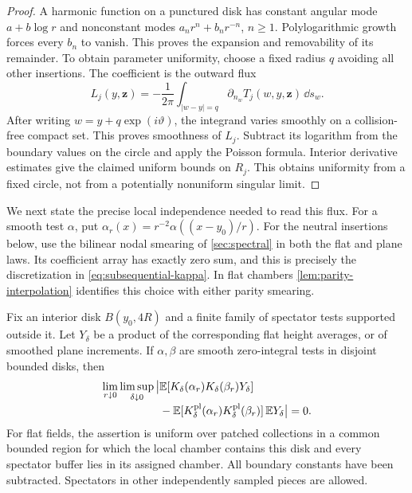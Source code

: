 \begin{proof}
A harmonic function on a punctured disk has constant angular mode
$a+b\log r$ and nonconstant modes $a_n r^n+b_n r^{-n}$, $n\geq1$.
Polylogarithmic growth forces every $b_n$ to vanish. This proves the
expansion and removability of its remainder. To obtain parameter
uniformity, choose a fixed radius $q$ avoiding all other insertions.
The coefficient is the outward flux
\begin{equation}
 L_j(y,\mathbf z)
 =-\frac1{2\pi}\int_{|w-y|=q}
                      \partial_{n_w}T_j(w,y,\mathbf z)\,\dd s_w.
 \label{eq:collision-flux}
\end{equation}
After writing $w=y+q\exp(i\vartheta)$, the integrand varies smoothly
on a collision-free compact set. This proves smoothness of $L_j$.
Subtract its logarithm from the boundary values on the circle and
apply the Poisson formula. Interior derivative estimates give the
claimed uniform bounds on $R_j$. This obtains uniformity from a
fixed circle, not from a potentially nonuniform singular limit.
\end{proof}

We next state the precise local independence needed to read this flux.
For a smooth test $\alpha$, put
$\alpha_r(x)=r^{-2}\alpha((x-y_0)/r)$. For the neutral insertions below,
use the bilinear nodal smearing of \cref{sec:spectral} in both the flat and
plane laws. Its coefficient array has exactly zero sum, and this is
precisely the discretization in \cref{eq:subsequential-kappa}.
In flat chambers \cref{lem:parity-interpolation} identifies this choice
with either parity smearing.

\begin{lemma}
\label{lem:neutral-pair-mixing}
Fix an interior disk $B(y_0,4R)$ and a finite family of spectator
tests supported outside it. Let $Y_\delta$ be a product of the
corresponding flat height averages, or of smoothed plane increments.
If $\alpha,\beta$ are smooth zero-integral tests in disjoint bounded
disks, then
\begin{align}
 \lim_{r\downarrow0}\limsup_{\delta\downarrow0}
 \big|&\mathbb E[K_\delta(\alpha_r)K_\delta(\beta_r)Y_\delta]
 \notag\\[-1mm]
 &-\mathbb E[K^{\mathrm{pl}}_\delta(\alpha_r)
                   K^{\mathrm{pl}}_\delta(\beta_r)]\,
                      \mathbb E Y_\delta\big|=0.
 \label{eq:neutral-factorization}
\end{align}
For flat fields, the assertion is uniform over patched collections in a
common bounded region for which the local chamber contains this disk and
every spectator buffer lies in its assigned chamber. All boundary constants have been
subtracted. Spectators in other independently sampled pieces are allowed.
\end{lemma}

